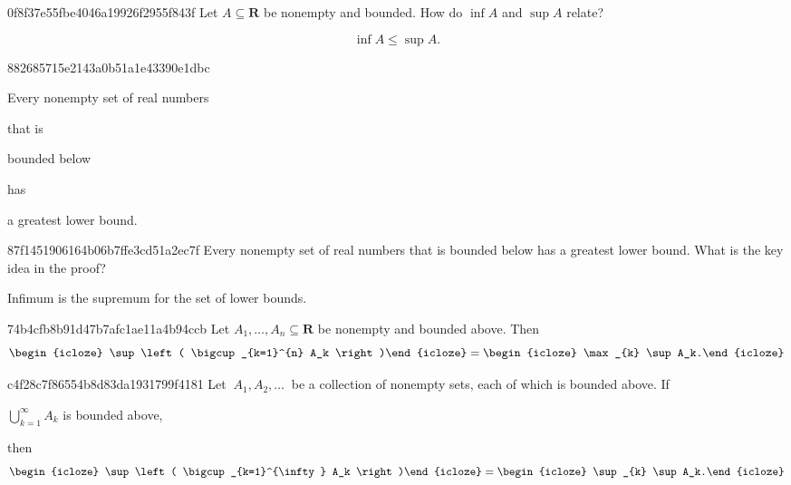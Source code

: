 \begin{note}{0f8f37e55fbe4046a19926f2955f843f}
    Let \({ A \subseteq \mathbf{R} }\) be nonempty and bounded. How do \({ \inf A }\) and \({ \sup A }\) relate?

    \begin{cloze}{1}
        \[
            \inf A \leq \sup A.
        \]
    \end{cloze}
\end{note}

\begin{note}{882685715e2143a0b51a1e43390e1dbc}
    \begin{icloze}{1}Every nonempty set of real numbers\end{icloze} that is \begin{icloze}{2}bounded below\end{icloze} has \begin{icloze}{3}a greatest lower bound.\end{icloze}
\end{note}

\begin{note}{87f1451906164b06b7ffe3cd51a2ec7f}
    Every nonempty set of real numbers that is bounded below has a greatest lower bound.
    What is the key idea in the proof?

    \begin{cloze}{1}
        Infimum is the supremum for the set of lower bounds.
    \end{cloze}
\end{note}

\begin{note}{74b4cfb8b91d47b7afc1ae11a4b94ccb}
    Let \({ A_1, \ldots, A_n \subseteq \mathbf{R} }\) be nonempty and bounded above.
    Then
    \[
        \begin{icloze}{2}\sup\left( \bigcup_{k=1}^{n} A_k \right)\end{icloze} = \begin{icloze}{1}\max_{k} \sup A_k.\end{icloze}
    \]
\end{note}

\begin{note}{c4f28c7f86554b8d83da1931799f4181}
    Let \({ \:A_1, A_2, \ldots\: }\) be a collection of nonempty sets, each of which is bounded above.
    If \begin{icloze}{3}\({ \bigcup_{k=1}^{\infty} A_k }\) is bounded above,\end{icloze} then
    \[
        \begin{icloze}{2}\sup\left( \bigcup_{k=1}^{\infty} A_k \right)\end{icloze} = \begin{icloze}{1}\sup_{k} \sup A_k.\end{icloze}
    \]
\end{note}

